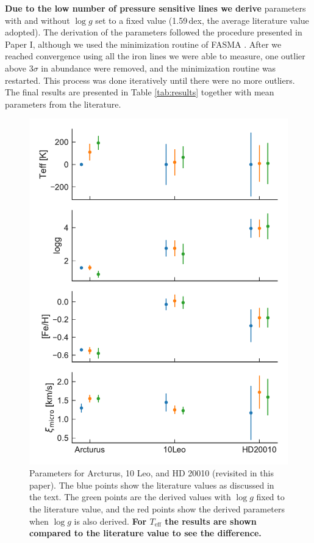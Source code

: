 \documentclass{aa}
\begin{document}
{\bf Due to the low number of pressure sensitive  lines we derive}
parameters with and without $\log g$ set to a fixed value (1.59\,dex, the average
literature value adopted). The derivation of the parameters followed the
procedure presented in Paper I, although we used the minimization routine of
FASMA \citep{Andreasen2017a}. After we reached convergence using all the iron
lines we were able to measure, one outlier above $3\sigma$ in abundance were
removed, and the minimization routine was restarted. This process was done
iteratively until there were no more outliers. The final results are presented
in Table \ref{tab:results} together with mean parameters from the literature.


\begin{figure}[htpb!]
    \centering
    \includegraphics[width=1.0\linewidth]{figures/parameters.pdf}
    \caption{Parameters for Arcturus, 10 Leo, and HD 20010 (revisited in this paper). The blue
             points show the literature values as discussed in the text. The green points are the
             derived values with $\log g$ fixed to the literature value, and the red points show the
             derived parameters when $\log g$ is also derived. {\bf For $T_\mathrm{eff}$ the results
             are shown compared to the literature value to see the difference.}}
    \label{fig:parameters}
\end{figure}
\end{document}
